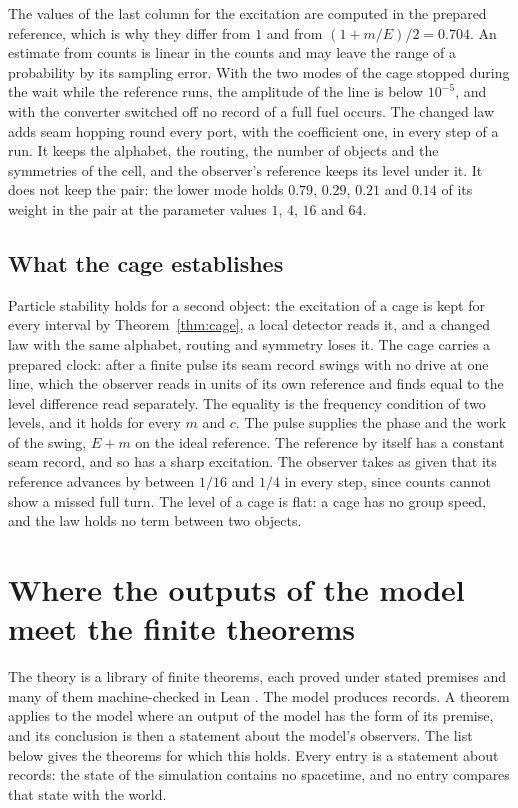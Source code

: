 \documentclass[11pt]{article}
\theoremstyle{definition}
\theoremstyle{remark}
\theoremstyle{plain}
\begin{document}
The values of the last column for the excitation are computed in the
prepared reference, which is why they differ from $1$ and from
$(1+m/E)/2=0.704$. An estimate from counts is linear in the counts and may
leave the range of a probability by its sampling error. With the two modes
of the cage stopped during the wait while the reference runs, the amplitude
of the line is below $10^{-5}$, and with the converter switched off no
record of a full fuel occurs. The changed law adds seam hopping round every
port, with the coefficient one, in every step of a run. It keeps the
alphabet, the routing, the number of objects and the symmetries of the
cell, and the observer's reference keeps its level under it. It does not
keep the pair: the lower mode holds $0.79$, $0.29$, $0.21$ and $0.14$ of
its weight in the pair at the parameter values $1$, $4$, $16$ and $64$.

\subsection{What the cage establishes}

Particle stability holds for a second object: the excitation of a cage is
kept for every interval by Theorem~\ref{thm:cage}, a local detector reads
it, and a changed law with the same alphabet, routing and symmetry loses
it. The cage carries a prepared clock: after a finite pulse its seam record
swings with no drive at one line, which the observer reads in units of its
own reference and finds equal to the level difference read separately. The
equality is the frequency condition of two levels, and it holds for every
$m$ and $c$. The pulse supplies the phase and the work of the swing, $E+m$
on the ideal reference. The reference by itself has a constant seam
record, and so has a sharp excitation. The observer takes as given that its
reference advances by between $1/16$ and $1/4$ in every step, since counts
cannot show a missed full turn. The level of a cage is flat: a cage has no
group speed, and the law holds no term between two objects.


\section{Where the outputs of the model meet the finite theorems}
\label{sec:joins}

The theory is a library of finite theorems, each proved under stated
premises and many of them machine-checked in Lean \cite{ophrepo}. The model
produces records. A theorem applies to the model where an output of the
model has the form of its premise, and its conclusion is then a statement
about the model's observers. The list below gives the theorems for which
this holds. Every entry is a statement about records: the state of the
simulation contains no spacetime, and no entry compares that state with the
world.
\end{document}
